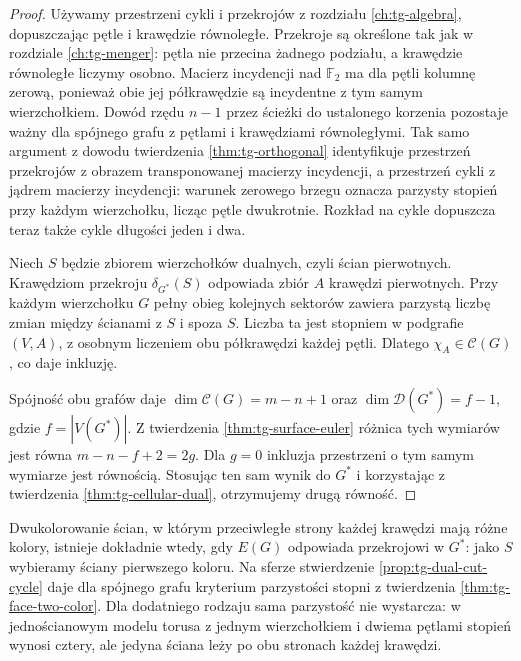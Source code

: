 \begin{proof}
Używamy przestrzeni cykli i przekrojów z rozdziału
\ref{ch:tg-algebra}, dopuszczając pętle i krawędzie
równoległe. Przekroje są określone tak jak w rozdziale
\ref{ch:tg-menger}: pętla nie przecina żadnego podziału,
a krawędzie równoległe liczymy osobno.
Macierz incydencji nad $\mathbb F_2$ ma dla pętli
kolumnę zerową, ponieważ obie jej półkrawędzie
są incydentne z tym samym wierzchołkiem.
Dowód rzędu $n-1$ przez ścieżki do ustalonego korzenia
pozostaje ważny dla spójnego grafu z pętlami i krawędziami
równoległymi. Tak samo argument z dowodu twierdzenia
\ref{thm:tg-orthogonal} identyfikuje przestrzeń przekrojów
z obrazem transponowanej macierzy incydencji, a przestrzeń
cykli z jądrem macierzy incydencji: warunek zerowego brzegu
oznacza parzysty stopień przy każdym wierzchołku, licząc
pętle dwukrotnie. Rozkład na cykle dopuszcza teraz także
cykle długości jeden i dwa.

Niech $S$ będzie zbiorem wierzchołków dualnych, czyli ścian
pierwotnych. Krawędziom przekroju $\delta_{G^*}(S)$
odpowiada zbiór $A$ krawędzi pierwotnych. Przy każdym
wierzchołku $G$ pełny obieg kolejnych sektorów zawiera
parzystą liczbę zmian między ścianami z $S$ i spoza $S$.
Liczba ta jest stopniem w podgrafie $(V,A)$, z osobnym
liczeniem obu półkrawędzi każdej pętli. Dlatego
$\chi_A\in\mathcal C(G)$, co daje inkluzję.

Spójność obu grafów daje $\dim\mathcal C(G)=m-n+1$
oraz $\dim\mathcal D(G^*)=f-1$, gdzie $f=|V(G^*)|$.
Z twierdzenia \ref{thm:tg-surface-euler} różnica tych
wymiarów jest równa $m-n-f+2=2g$.
Dla $g=0$ inkluzja przestrzeni o tym samym wymiarze
jest równością. Stosując ten sam wynik do $G^*$
i korzystając z twierdzenia \ref{thm:tg-cellular-dual},
otrzymujemy drugą równość.
\end{proof}

\begin{uwaga}
Dwukolorowanie ścian, w którym przeciwległe strony
każdej krawędzi mają różne kolory, istnieje dokładnie
wtedy, gdy $E(G)$ odpowiada przekrojowi w $G^*$:
jako $S$ wybieramy ściany pierwszego koloru.
Na sferze stwierdzenie \ref{prop:tg-dual-cut-cycle}
daje dla spójnego grafu kryterium parzystości stopni
z twierdzenia \ref{thm:tg-face-two-color}.
Dla dodatniego rodzaju sama parzystość nie wystarcza:
w jednościanowym modelu torusa z jednym wierzchołkiem
i dwiema pętlami stopień wynosi cztery, ale jedyna ściana
leży po obu stronach każdej krawędzi.
\end{uwaga}

